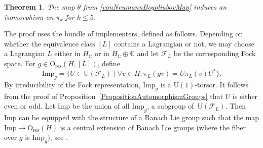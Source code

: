 \documentclass[10pt,a4paper]{amsart}
\numberwithin{equation}{section}
\newtheorem{Theorem}{Theorem}[section]
\newcommand{\C}{\mathbb{C}}
\newcommand{\res}{\mathrm{res}}
\newcommand{\Imp}{\mathrm{Imp}}
\newcommand{\U}{\mathrm{U}}
\renewcommand{\O}{\mathrm{O}}
\begin{document}
\begin{Theorem} \label{TheoremIsoPileq2}
The map $\theta$ from \eqref{vonNeumannBogoliubovMap} induces an isomorphism on $\pi_k$ for $k \leq 5$.
\end{Theorem}

The proof uses the bundle of implementers, defined as follows.
Depending on whether the equivalence class $[L]$ contains a Lagrangian or not, we may choose a Lagrangian $L$ either in $H_\C$ or in $H_\C \oplus \C$ and let $\mathcal{F}_L$ be the corresponding Fock space.
For $g \in \O_{\res}(H, [L])$, define
\begin{equation*}
 \Imp_g = \{ U \in \U(\mathcal{F}_L) \mid \forall v \in H\colon \pi_L (g v) = U \pi_L(v) U^*\}.
\end{equation*}
By irreducibility of the Fock representation, $\Imp_g$ is a $\U(1)$-torsor.
It follows from the proof of Proposition~\ref{PropositionAutomorphismGroups} that $U$ is either even or odd.
Let $\Imp$ be the union of all $\Imp_g$, a subgroup of~$\U(\mathcal{F}_L)$.
Then $\Imp$ can be equipped with the structure of a Banach Lie group such that the map $\Imp \to \O_{\res}(H)$ is a central extension of Banach Lie groups (where the fiber over $g$ is $\Imp_g$), see \cite[Section~3.5]{KristelWaldorf1}.
\end{document}
